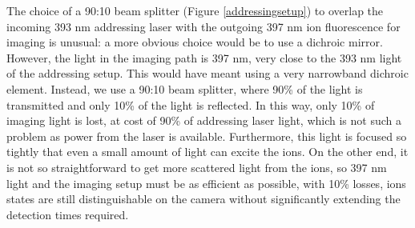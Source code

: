 The choice of a 90:10 beam splitter (Figure \ref{addressingsetup}) to overlap the incoming 393 nm addressing laser with the outgoing 397 nm ion fluorescence for imaging is unusual: a more obvious choice would be to use a dichroic mirror. However, the light in the imaging path is 397 nm, very close to the 393 nm light of the addressing setup. This would have meant using a very narrowband dichroic element. Instead, we use a 90:10 beam splitter, where 90\% of the light is transmitted and only 10\% of the light is reflected. In this way, only 10\% of imaging light is lost, at cost of 90\% of addressing laser light, which is not such a problem as power from the laser is available. Furthermore, this light is focused so tightly that even a small amount of light can excite the ions. On the other end, it is not so straightforward to get more scattered light from the ions, so 397 nm light and the imaging setup must be as efficient as possible, with 10\% losses, ions states are still distinguishable on the camera without significantly extending the detection times required.

